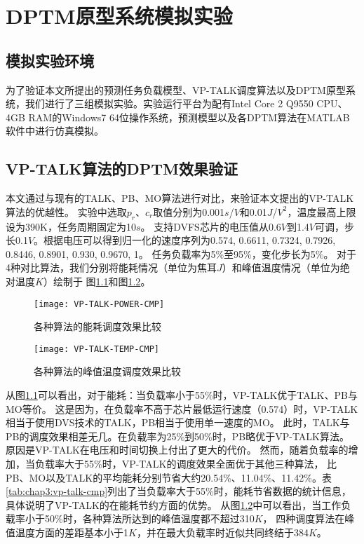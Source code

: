 


\chapter{DPTM原型系统模拟实验}
\label{cha:DPTMexperiments}

\section{模拟实验环境}
为了验证本文所提出的预测任务负载模型、VP-TALK调度算法以及DPTM原型系统，我们进行了三组模拟实验。实验运行平台为配有Intel Core 2 Q9550 CPU、4GB RAM的Windows7 64位操作系统，预测模型以及各DPTM算法在MATLAB软件中进行仿真模拟。

\section{VP-TALK算法的DPTM效果验证}
本文通过与现有的TALK、PB、MO算法进行对比，来验证本文提出的VP-TALK算法的优越性。 实验中选取$p_r$、$c_r$取值分别为0.001$s$/$V$和0.01$J$/$V^2$，温度最高上限设为390K，任务周期固定为10$s$。 支持DVFS芯片的电压值从0.6$V$到1.4$V$可调，步长0.1$V$。根据电压可以得到归一化的速度序列为{0.574, 0.6611, 0.7324, 0.7926, 0.8446, 0.8901, 0.930, 0.9670, 1}。 任务负载率为5\%至95\%，变化步长为5\%。 对于4种对比算法，我们分别将能耗情况（单位为焦耳$J$）和峰值温度情况（单位为绝对温度$K$）绘制于 图\ref{fig:vp-talk-power-cmp}和图\ref{fig:vp-talk-temp-cmp}。
\begin{figure}[H]
  \centering
  \texttt{[image: VP-TALK-POWER-CMP]}
  \caption{各种算法的能耗调度效果比较}
  \label{fig:vp-talk-power-cmp}
\end{figure}
\begin{figure}[H]
  \centering
  \texttt{[image: VP-TALK-TEMP-CMP]}
  \caption{各种算法的峰值温度调度效果比较}
  \label{fig:vp-talk-temp-cmp}
\end{figure}
从图\ref{fig:vp-talk-power-cmp}可以看出，对于能耗：当负载率小于55\%时，VP-TALK优于TALK、PB与MO等价。 这是因为，在负载率不高于芯片最低运行速度（0.574）时，VP-TALK相当于使用DVS技术的TALK，PB相当于使用单一速度的MO。 此时，TALK与PB的调度效果相差无几。在负载率为25\%到50\%时，PB略优于VP-TALK算法。 原因是VP-TALK在电压和时间切换上付出了更大的代价。 然而，随着负载率的增加，当负载率大于55\%时，VP-TALK的调度效果全面优于其他三种算法， 比PB、MO以及TALK的平均能耗分别节省大约20.54\%、11.04\%、11.42\%。表\ref{tab:chap3:vp-talk-cmp}列出了当负载率大于55\%时，能耗节省数据的统计信息， 具体说明了VP-TALK的在能耗节约方面的优势。
从图\ref{fig:vp-talk-temp-cmp}中可以看出，当工作负载率小于50\%时，各种算法所达到的峰值温度都不超过310$K$， 四种调度算法在峰值温度方面的差距基本小于1$K$，并在最大负载率时近似共同终结于384$K$。


